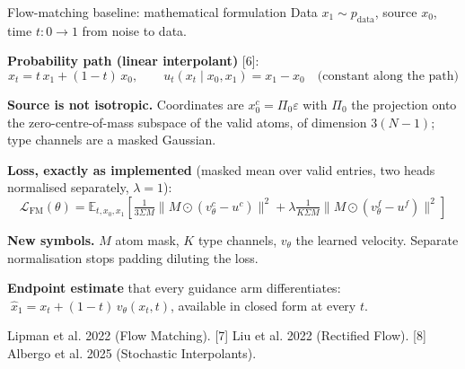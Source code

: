\documentclass[aspectratio=169,10pt]{beamer}
\newcommand{\theslidelabel}{}
\newcommand{\lbl}[1]{\renewcommand{\theslidelabel}{#1}}
\newcommand{\srcs}[1]{\vfill{\raggedleft\color{grayt}\fontsize{4.9}{5.6}\selectfont #1\par}}
\begin{document}
\lbl{1c}
\begin{frame}{Flow-matching baseline: mathematical formulation}
  Data $x_1\sim p_{\mathrm{data}}$, source $x_0$, time $t:0\to1$ from noise to data.

  \medskip
  \textbf{Probability path (linear interpolant)} [6]:
  \[ x_t = t\,x_1 + (1-t)\,x_0 ,\qquad
     u_t(x_t\mid x_0,x_1) = x_1 - x_0 \quad\text{(constant along the path)} \]

  \textbf{Source is not isotropic.} Coordinates are $x_0^{c}=\Pi_0\varepsilon$ with
  $\Pi_0$ the projection onto the zero-centre-of-mass subspace of the valid atoms,
  of dimension $3(N-1)$; type channels are a masked Gaussian.

  \medskip
  \textbf{Loss, exactly as implemented} (masked mean over valid entries, two heads
  normalised separately, $\lambda=1$):
  \[ \mathcal{L}_{\mathrm{FM}}(\theta)=\mathbb{E}_{t,x_0,x_1}\!\left[
     \tfrac{1}{3\Sigma M}\|M\odot(v^{c}_\theta-u^{c})\|^2
   + \lambda\tfrac{1}{K\Sigma M}\|M\odot(v^{f}_\theta-u^{f})\|^2\right] \]

  \textbf{New symbols.} $M$ atom mask, $K$ type channels, $v_\theta$ the learned
  velocity. Separate normalisation stops padding diluting the loss.

  \medskip
  \textbf{Endpoint estimate} that every guidance arm differentiates:
  $\;\hat{x}_1 = x_t + (1-t)\,v_\theta(x_t,t)$, available in closed form at every $t$.

  \srcs{[6] Lipman et al. 2022 (Flow Matching). [7] Liu et al. 2022 (Rectified Flow).
        [8] Albergo et al. 2025 (Stochastic Interpolants).}
\end{frame}
\end{document}
